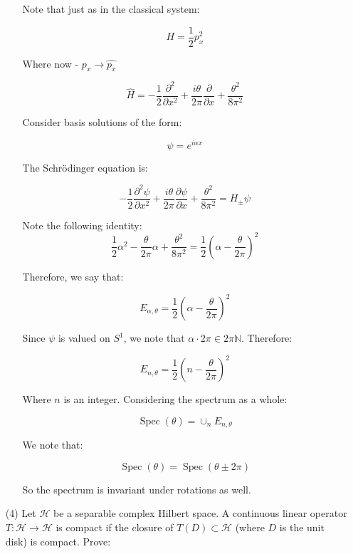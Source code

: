 \begin{enumerate}
\begin{enumerate}
        Note that just as in the classical system:

        $$H = \frac{1}{2} p_{x}^2$$

        Where now - $p_{x} \to \hat{p_{x}}$

        $$\hat{H} = -\frac{1}{2} \frac{\partial^2}{\partial x^2} + \frac{i \theta}{2 \pi} \frac{\partial}{\partial x} + \frac{\theta^2}{8 \pi^2}$$

        Consider basis solutions of the form:

        $$\psi = e^{i \alpha x}$$

        The Schrödinger equation is:

        $$-\frac{1}{2} \frac{\partial^2 \psi}{\partial x^2} + \frac{i \theta}{2 \pi} \frac{\partial \psi}{\partial x} +  \frac{\theta^2}{8 \pi^2} = H_{\pm} \psi$$

        Note the following identity:
        $$\frac{1}{2} \alpha^2 - \frac{\theta}{2 \pi} \alpha + \frac{\theta^2}{8 \pi^2} = \frac{1}{2} (\alpha - \frac{\theta}{2 \pi})^2$$

        Therefore, we say that:

        $$E_{\alpha, \theta} = \frac{1}{2} (\alpha - \frac{\theta}{2 \pi})^2$$

        Since $\psi$ is valued on $S^{1}$, we note that $\alpha \cdot 2\pi \in 2 \pi \mathbb{N}$. Therefore:

        
        $$E_{n, \theta} = \frac{1}{2} (n - \frac{\theta}{2 \pi})^2$$

        Where $n$ is an integer. Considering the spectrum as a whole:

        $$\operatorname{Spec}(\theta) = \cup_{n} E_{n, \theta}$$

        We note that:

        $$\operatorname{Spec}(\theta) = \operatorname{Spec}(\theta \pm 2 \pi)$$

        So the spectrum is invariant under rotations as well. 
       
    \end{enumerate}

    

    \item[(4)] Let $\mathcal{H}$ be a separable complex Hilbert space. A continuous linear operator $T : \mathcal{H} \to \mathcal{H}$ is compact if the closure of $T(D) \subset \mathcal{H}$ (where $D$ is the unit disk) is compact. Prove:


\end{enumerate}

